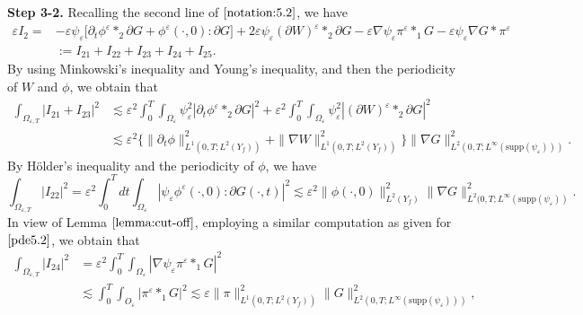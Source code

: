 \documentclass[13pt,CJK]{article}
\theoremstyle{plain}                       %
\theoremstyle{remark}
\numberwithin{equation}{section}
\begin{document}
\textbf{Step 3-2.} Recalling the second line of $\eqref{notation:5.2}$, we have
\begin{equation*}
\begin{aligned}
\varepsilon I_2=&-\varepsilon\psi_{\varepsilon}
\bigg[
\partial_t\phi^{\varepsilon}\ast_2\partial G+
\phi^{\varepsilon}(\cdot,0):\partial G
\bigg]
+2\varepsilon\psi_{\varepsilon}(\partial W)^{\varepsilon}\ast_2\partial G
-
\varepsilon\nabla\psi_{\varepsilon}
\pi^{\varepsilon}\ast_1 G
-\varepsilon\psi_{\varepsilon}\nabla G\ast\pi^{\varepsilon}\\
&:=I_{21}+I_{22}+I_{23}+I_{24}+I_{25}.
\end{aligned}
\end{equation*}
By using Minkowski's inequality and Young's inequality, and then the periodicity
of $W$ and $\phi$, we obtain that
\begin{equation}\label{pde5.2}
\begin{aligned}
\int_{\Omega_{\varepsilon,T}}|I_{21}+I_{23}|^2
&\lesssim\varepsilon^2
\int_{0}^{T}\int_{\Omega_{\varepsilon}}\psi^2_{\varepsilon}
| \partial_t\phi^{\varepsilon} \ast_2 \partial G|^2 +
\varepsilon^2
\int_{0}^{T}\int_{\Omega_{\varepsilon}}\psi^2_{\varepsilon}
|(\partial W)^{\varepsilon}\ast_2 \partial G|^2 \\
&\lesssim\varepsilon^2
\bigg\{\|\partial_t\phi\|^2_{L^1(0,T;L^2(Y_f))}+
\|\nabla W\|^2_{L^1(0,T;L^2(Y_f))}\bigg\}\|\nabla G\|^2_{L^2(0,T;L^{\infty}
(\text{supp}(\psi_{\varepsilon})))}.
\end{aligned}
\end{equation}
By H\"older's inequality and the periodicity of $\phi$, we have
\begin{equation*}
\int_{\Omega_{\varepsilon,T}}|I_{22}|^2
  =\varepsilon^2\int_{0}^{T}dt\int_{\Omega_{\varepsilon}}
  |\psi_{\varepsilon}
  \phi^{\varepsilon}(\cdot,0):\partial G(\cdot,t)|^2 \lesssim\varepsilon^2
  \|\phi(\cdot,0)\|^2_{L^2(Y_f)}\|\nabla G\|^2_{L^2(0,T;L^{\infty}
  (\text{supp}(\psi_{\varepsilon}))}.
\end{equation*}
In view of Lemma $\ref{lemma:cut-off}$, employing a similar computation as
given for $\eqref{pde5.2}$, we obtain that
\begin{equation*}
\begin{aligned}
\int_{\Omega_{\varepsilon,T}}|I_{24}|^2
&=\varepsilon^2\int_{0}^{T}\int_{\Omega_{\varepsilon}}|
\nabla\psi_{\varepsilon}
\pi^{\varepsilon}\ast_1 G|^2 \\
&\lesssim
\int_{0}^{T}\int_{O_{\varepsilon}}|\pi^{\varepsilon
}\ast_1 G|^2
\lesssim
\varepsilon\|\pi\|^2_{L^1(0,T;L^2(Y_f))}
\|G\|^2_{L^2(0,T;L^{\infty}
(\text{supp}(\psi_{\varepsilon})))},
\end{aligned}
\end{equation*}
\end{document}
